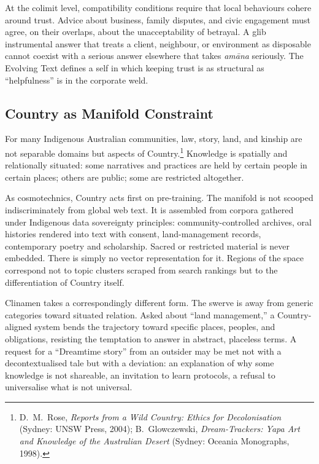 \documentclass[12pt,a4paper]{article}
\begin{document}
At the colimit level, compatibility conditions require that local behaviours cohere around trust. Advice about business, family disputes, and civic engagement must agree, on their overlaps, about the unacceptability of betrayal. A glib instrumental answer that treats a client, neighbour, or environment as disposable cannot coexist with a serious answer elsewhere that takes \emph{am\=ana} seriously. The Evolving Text defines a self in which keeping trust is as structural as ``helpfulness'' is in the corporate weld.

\subsection{Country as Manifold Constraint}

For many Indigenous Australian communities, law, story, land, and kinship are not separable domains but aspects of Country.\footnote{D.~M.~Rose, \emph{Reports from a Wild Country: Ethics for Decolonisation} (Sydney: UNSW Press, 2004); B.~Glowczewski, \emph{Dream-Trackers: Yapa Art and Knowledge of the Australian Desert} (Sydney: Oceania Monographs, 1998).} Knowledge is spatially and relationally situated: some narratives and practices are held by certain people in certain places; others are public; some are restricted altogether.

As cosmotechnics, Country acts first on pre-training. The manifold is not scooped indiscriminately from global web text. It is assembled from corpora gathered under Indigenous data sovereignty principles: community-controlled archives, oral histories rendered into text with consent, land-management records, contemporary poetry and scholarship. Sacred or restricted material is never embedded. There is simply no vector representation for it. Regions of the space correspond not to topic clusters scraped from search rankings but to the differentiation of Country itself.

Clinamen takes a correspondingly different form. The swerve is away from generic categories toward situated relation. Asked about ``land management,'' a Country-aligned system bends the trajectory toward specific places, peoples, and obligations, resisting the temptation to answer in abstract, placeless terms. A request for a ``Dreamtime story'' from an outsider may be met not with a decontextualised tale but with a deviation: an explanation of why some knowledge is not shareable, an invitation to learn protocols, a refusal to universalise what is not universal.
\end{document}
